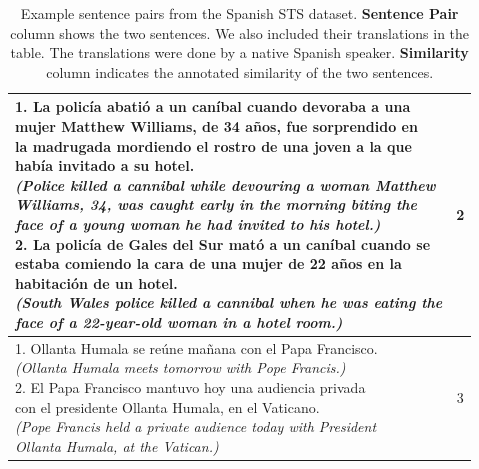 \begin{enumerate}
\begin{table}[ht!]
\begin{tabular}{l|c}
			\hline
			\makecell[l]{1. La policía abatió a un caníbal cuando devoraba a una  \\ mujer Matthew Williams, de 34 años, fue sorprendido en \\ la madrugada mordiendo el rostro de una joven a la que  \\ había invitado a su hotel. \\ 
				\textit{(Police killed a cannibal while devouring a woman Matthew } \\ \textit{Williams, 34, was caught early in the morning biting the} \\ \textit{ face of a young woman he had invited to his hotel.)} \\
				2. La policía de Gales del Sur mató a un caníbal cuando se \\ estaba comiendo la cara de una mujer de 22 años en la \\ habitación de un hotel. \\ 
			\textit{(South Wales police killed a cannibal when he was eating the } \\ \textit{face of a 22-year-old woman in a hotel room.)} } & 2  \\
			\hline
			\makecell[l]{1. Ollanta Humala se reúne mañana con el Papa Francisco. \\
				\textit{(Ollanta Humala meets tomorrow with Pope Francis.)} \\ 
				2. El Papa Francisco mantuvo hoy una audiencia privada \\ con el presidente Ollanta Humala, en el Vaticano. \\
			\textit{(Pope Francis held a private audience today with President} \\ \textit{Ollanta Humala, at the Vatican.)}} & 3  \\
			\hline               
		\end{tabular}
	\caption[Example sentence pairs from the Spanish STS dataset]{Example sentence pairs from the Spanish STS dataset. \textbf{Sentence Pair} column shows the two sentences. We also included their translations in the table. The translations were done by a native Spanish speaker. \textbf{Similarity} column indicates the annotated similarity of the two sentences. }
	\label{tab:spanishdata}
\end{table}  


\end{enumerate}
